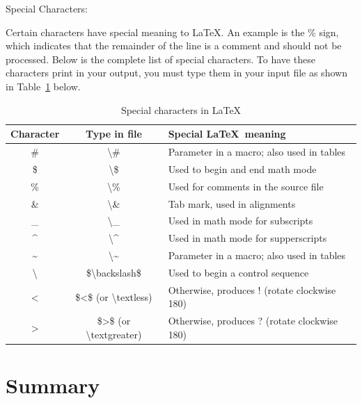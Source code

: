 \documentclass[12pt,openright]{book}
\begin{document}
Special Characters:

Certain characters have special meaning to \LaTeX. An example is the \% sign, which indicates that the remainder of the line is a comment and should not be processed. Below is the complete list of special characters. To have these characters print in your output, you must type them in your input file as shown in Table~\ref{tab:special characters} below.

\begin{center}
  \begin{table}[!htbp]
    \caption{Special characters in \LaTeX}
    \label{tab:special characters}
    \begin{tabular}{@{}ccl@{}}
      \toprule
      \textbf{Character} & \textbf{Type in file} & \textbf{Special \LaTeX\ meaning}  \\ 
      \midrule
      \#	& \textbackslash\# & Parameter in a macro; also used in tables \\
      \$	& \textbackslash\$ & Used to begin and end math mode \\
      \%	& \textbackslash\% & Used for comments in the source file \\
      \&	& \textbackslash\& & Tab mark, used in alignments \\
      \_	& \textbackslash\_ & Used in math mode for subscripts \\
      \^{}	& \textbackslash\^{} & Used in math mode for supperscripts \\
      \~{}	& \textbackslash\~{} & Parameter in a macro; also used in tables \\
      \textbackslash	& \$\textbackslash backslash\$ & Used to begin a control sequence \\
      $<$	& \$<\$ (or \textbackslash textless) & Otherwise, produces ! (rotate clockwise 180\degree) \\
      $>$	& \$>\$ (or \textbackslash textgreater) & Otherwise, produces ? (rotate clockwise 180\degree) \\
      \bottomrule
    \end{tabular}
  \end{table}
\end{center}



\chapter{Summary}
\lipsum[1-3]

{}

\end{document}
